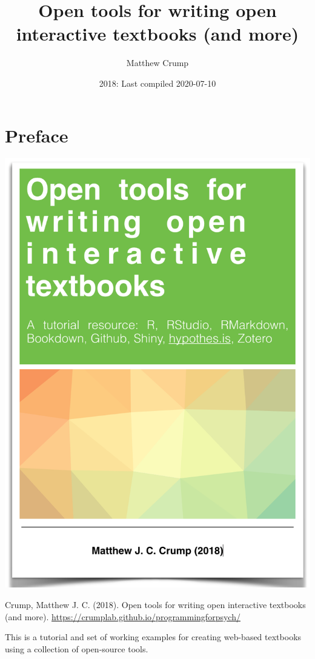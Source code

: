 \documentclass[
]{book}
\title{Open tools for writing open interactive textbooks (and more)}
\author{Matthew Crump}
\date{2018: Last compiled 2020-07-10}
\begin{document}
\maketitle

{
\setcounter{tocdepth}{1}
\tableofcontents
}
\hypertarget{preface}{%
\chapter*{Preface}\label{preface}}

\begin{center}\includegraphics{OER} \end{center}

Crump, Matthew J. C. (2018). Open tools for writing open interactive textbooks (and more). \url{https://crumplab.github.io/programmingforpsych/}

This is a tutorial and set of working examples for creating web-based textbooks using a collection of open-source tools.
\end{document}
